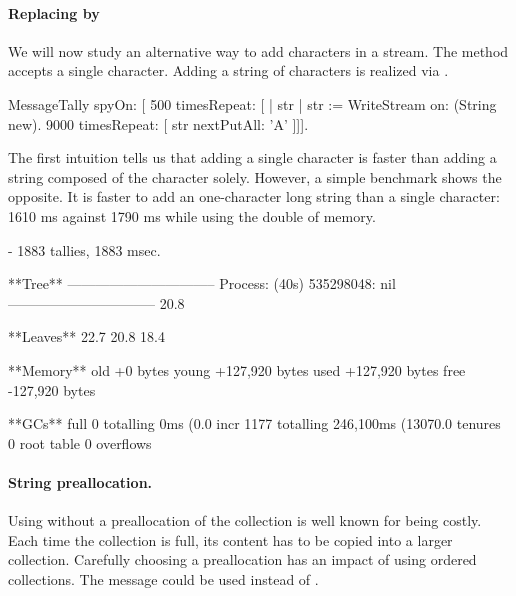 \documentclass[a4paper,10pt,twoside]{book}
\begin{document}
\paragraph{Replacing  by } We will now study an alternative way to add characters in a stream. The  method accepts a single character. Adding a string of characters is realized via .

\begin{code}{}
MessageTally spyOn: 
    [ 500 timesRepeat: [
                    | str |  
                    str := WriteStream on: (String new). 
                    9000 timesRepeat: [ str nextPutAll: 'A' ]]].
\end{code}

The first intuition tells us that adding a single character is faster than adding a string composed of the character solely. However, a simple benchmark shows the opposite. It is faster to add an one-character long string than a single character: 1610 ms against 1790 ms while using the double of memory.

\begin{code}{}

 - 1883 tallies, 1883 msec.

**Tree**
--------------------------------
Process: (40s)  535298048: nil
--------------------------------
20.8%

**Leaves**
22.7%
20.8%
18.4%

**Memory**
	old			+0 bytes
	young		+127,920 bytes
	used		+127,920 bytes
	free		-127,920 bytes

**GCs**
	full			0 totalling 0ms (0.0%
	incr		1177 totalling 246,100ms (13070.0%
	tenures		0
	root table	0 overflows
\end{code}



\paragraph{String preallocation.} Using  without a preallocation of the collection is well known for being costly. Each time the collection is full, its content has to be copied into a larger collection. Carefully choosing a preallocation has an impact of using ordered collections. The message  could be used instead of .
\end{document}

